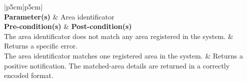 \begin{longtable}{ |p{5cm}|p{5cm}| }
        \hline
         \\
        \hline
        \textbf{Parameter(s)} & Area identificator \\
        \hline
        \textbf{Pre-condition(s)} & \textbf{Post-condition(s)} \\
        \hline
	The area identificator does not match any area registered in the system. & Returns a specific error. \\
	\hline
	The area identificator matches one registered area in the system. & Returns a positive notification. The matched-area details are returned in a correctly encoded format.
\end{longtable}
